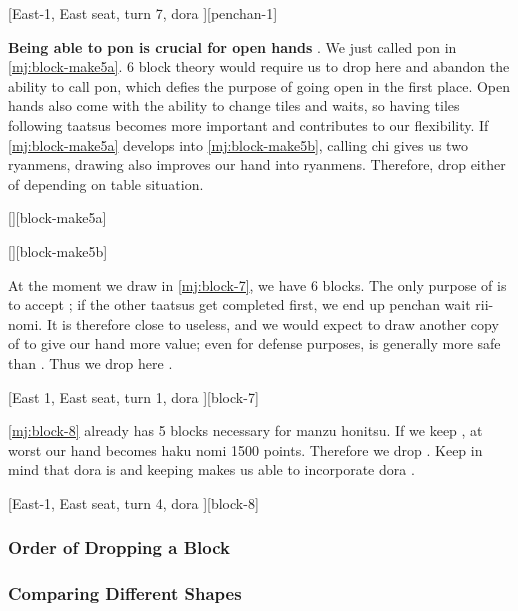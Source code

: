 \documentclass[12pt]{article}
\begin{document}
[East-1, East seat, turn 7, dora ][penchan-1]

\textbf{Being able to pon is crucial for open hands} \citep{yoteru-6block}. We just called pon  in \ref{mj:block-make5a}. 6 block theory would require us to drop  here and abandon the ability to call  pon, which defies the purpose of going open in the first place. Open hands also come with the ability to change tiles and waits, so having tiles following taatsus becomes more important and contributes to our flexibility. If \ref{mj:block-make5a} develops into \ref{mj:block-make5b}, calling  chi gives us two ryanmens, drawing  also improves our hand into ryanmens. Therefore, drop either of  depending on table situation.

[][block-make5a]

[][block-make5b]

At the moment we draw  in \ref{mj:block-7}, we have 6 blocks. The only purpose of  is to accept ; if the other taatsus get completed first, we end up  penchan wait rii-nomi. It is therefore close to useless, and we would expect to draw another copy of  to give our hand more value; even for defense purposes,  is generally more safe than . Thus we drop  here \citep[][pp.~154--155]{suphx}.

[East 1, East seat, turn 1, dora ][block-7]

\ref{mj:block-8} already has 5 blocks necessary for manzu honitsu. If we keep , at worst our hand becomes haku nomi 1500 points. Therefore we drop . Keep in mind that dora is  and keeping  makes us able to incorporate dora \citep[][pp.~156--157]{suphx}.

[East-1, East seat, turn 4, dora ][block-8]


\subsubsection{Order of Dropping a Block} \label{subsub:6block-order}

\subsubsection*{Comparing Different Shapes}
\end{document}

